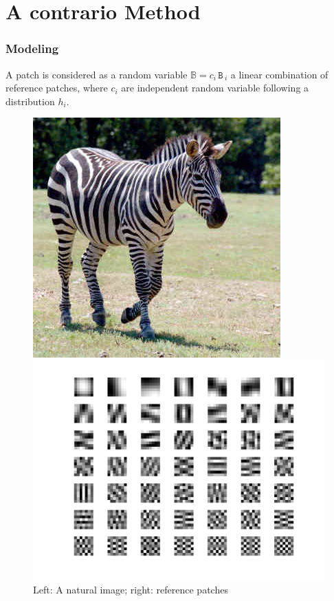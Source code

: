 \documentclass[compress]{beamer} %
\newcommand{\mat}[1]{\ensuremath{\,\mathtt{#1}\,}}
\begin{document}
 \section{A contrario Method}
 \begin{frame}
  \frametitle{Modeling}
  A patch is considered as a random variable $\mathbb{B}=c_i \mat{B}_i$ a linear combination of reference patches, where $c_i$ are independent random variable following a distribution $h_i$.
	\begin{figure}[h!]
	\centering
	\begin{minipage}{0.4\linewidth}
	\includegraphics[width=\linewidth]{zebra.jpg}
	  
	\end{minipage}
	\begin{minipage}{0.4\linewidth}
	\includegraphics[width=\linewidth]{princomp_zebra.png}
    
	\end{minipage}
	    \caption{Left: A natural image; right: reference patches}
	
	\end{figure}      
 \end{frame}
\end{document}
